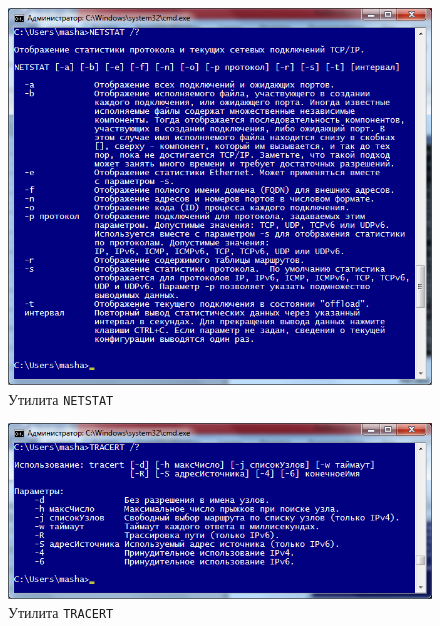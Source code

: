 \begin{figure}[h!]
  \centering
  \includegraphics[width=0.9\linewidth]{pic/netstat}
  \caption{Утилита \texttt{NETSTAT}}
  \label{pic:netstat}
\end{figure}

\begin{figure}[h!]
  \centering
  \includegraphics[width=0.9\linewidth]{pic/tracert}
  \caption{Утилита \texttt{TRACERT}}
  \label{pic:tracert}
\end{figure}

\newpage

